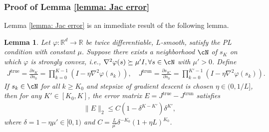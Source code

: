 \documentclass{article}
\def\R{\mathbb{R}}
\newtheorem{lemma}{Lemma}
\begin{document}
\subsubsection{Proof of Lemma \ref{lemma: Jac error}}
Lemma \ref{lemma: Jac error} is an immediate result of the following lemma.
\begin{lemma}\label{lemma: general Jac error}
    Let $\varphi: \R^d \rightarrow \R$ be twice differentiable, $L$-smooth, satisfy the PL condition with constant $\mu$. Suppose there exists a neighborhood $\cN$ of $s_K$ on which $\varphi$ is strongly convex, i.e., $\nabla^2 \varphi(s) \succeq \mu' I, \forall s \in \cN$ with $\mu' > 0$. Define 
    \begin{align*}
        J^\mathrm{true} = \frac{\partial s_K}{ \partial s_0} = \prod_{k=0}^{K-1} (I - \eta \nabla^2 \varphi (s_k)),
        \quad 
        J^\mathrm{trun} = \frac{\partial s_{K'}}{ \partial s_0} = \prod_{k=0}^{K'-1} (I - \eta \nabla^2 \varphi (s_k)).
    \end{align*}
    If $s_k \in \cN$ for all $k \geq K_0$ and stepsize of gradient descent is chosen $\eta \in (0, {1}/{L}]$, then for any $K' \in [K_0, K]$, the error matrix $E = J^\mathrm{true} - J^\mathrm{trun}$ satisfies
    \begin{align*}
        \| E \|_2 \leq C ( 1 - \delta^{K-K'}) \delta^{K'},
    \end{align*}
    where $\delta = 1 - \eta \mu' \in [0, 1)$ and $C = \frac{L}{\mu'} \delta^{-K_0}(1 + \eta L)^{K_0}$.
\end{lemma}
\end{document}
